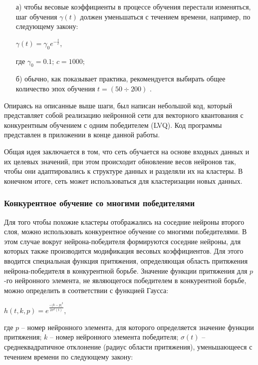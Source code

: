 \documentclass[bachelor, och, referat]{template}
\begin{document}
\begin{enumerate}
    \item[а)] чтобы весовые коэффициенты в процессе обучения перестали
    изменяться, шаг обучения $\gamma(t)$ должен уменьшаться с течением времени, 
    например, по следующему закону:

    \begin{center}
        $\gamma(t) = \gamma_0 e^{-\frac{t}{c}}$,
    \end{center}
    где $\gamma_0 = 0.1$; $c = 1000$;
    \item[б)] обычно, как показывает практика, рекомендуется выбирать 
    общее количество эпох обучения $t = (50 \div 200)$ \cite{nn1}.
\end{enumerate}


Опираясь на описанные выше шаги, был написан небольшой код, который представляет собой
реализацию нейронной сети для векторного квантования с конкурентным обучением с одним победителем (LVQ).
Код программы представлен в приложении в конце данной работы.

Общая идея заключается в том, что сеть обучается на основе входных данных и их целевых значений, 
при этом происходит обновление весов нейронов так, чтобы они адаптировались к структуре данных и 
разделяли их на кластеры. В конечном итоге, сеть может использоваться для кластеризации 
новых данных.


\subsubsection{Конкурентное обучение со многими победителями}

Для того чтобы похожие кластеры отображались на соседние нейроны 
второго слоя, можно использовать конкурентное обучение со многими 
победителями. В этом случае вокруг нейрона-победителя формируются 
соседние нейроны, для которых также производится модификация
весовых коэффициентов. Для этого вводится специальная функция притяжения, 
определяющая область притяжения нейрона-победителя в конкурентной борьбе. 
Значение функции притяжения для $p$-го нейронного
элемента, не являющегося победителем в конкурентной борьбе, можно
определить в соответствии с функцией Гаусса:

\begin{center}
    $h(t, k, p) = e^{\frac{-|k - p|^2}{2\sigma^2(t)}}$,
\end{center}

где $p$ -- номер нейронного элемента, для которого определяется 
значение функции притяжения; $k$ -- номер нейронного элемента 
победителя; $\sigma(t)$ -- среднеквадратичное отклонение (радиус 
области притяжения), уменьшающееся с течением времени по следующему закону:
\end{document}

